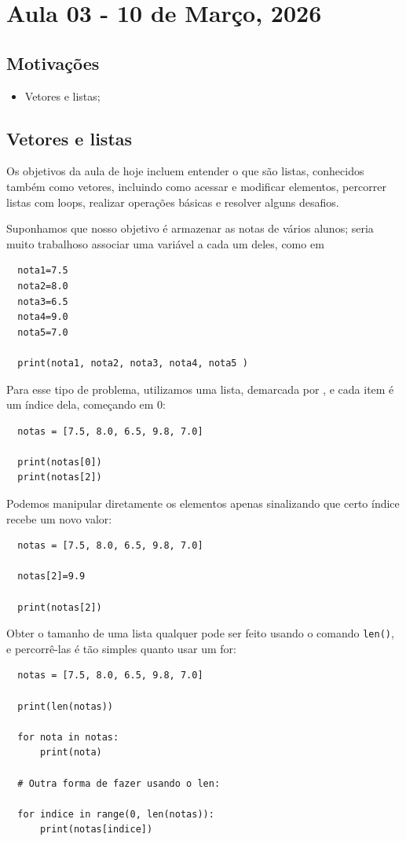 \documentclass[../numerical_methods.tex]{subfiles}
\begin{document}
\section{Aula 03 - 10 de Março, 2026}
\subsection{Motivações}
\begin{itemize}
	\item Vetores e listas;
\end{itemize}
\subsection{Vetores e listas}
Os objetivos da aula de hoje incluem entender o que são listas, conhecidos também como vetores, incluindo como acessar e modificar elementos, percorrer listas com loops, realizar operações básicas e resolver alguns desafios.

Suponhamos que nosso objetivo é armazenar as notas de vários alunos; seria muito trabalhoso associar uma variável a cada um deles, como em
\begin{verbatim}
  nota1=7.5
  nota2=8.0
  nota3=6.5
  nota4=9.0
  nota5=7.0

  print(nota1, nota2, nota3, nota4, nota5 )
\end{verbatim}
Para esse tipo de problema, utilizamos uma lista, demarcada por \texttt{}, e cada item é um índice dela, começando em 0:
\begin{verbatim}
  notas = [7.5, 8.0, 6.5, 9.8, 7.0]

  print(notas[0])
  print(notas[2])
\end{verbatim}

Podemos manipular diretamente os elementos apenas sinalizando que certo índice recebe um novo valor:
\begin{verbatim}
  notas = [7.5, 8.0, 6.5, 9.8, 7.0]

  notas[2]=9.9

  print(notas[2])
\end{verbatim}

Obter o tamanho de uma lista qualquer pode ser feito usando o comando \texttt{len()}, e percorrê-las é tão simples quanto usar um for:
\begin{verbatim}
  notas = [7.5, 8.0, 6.5, 9.8, 7.0]

  print(len(notas))

  for nota in notas:
      print(nota)

  # Outra forma de fazer usando o len:

  for indice in range(0, len(notas)):
      print(notas[indice]) 
\end{verbatim}
\end{document}
